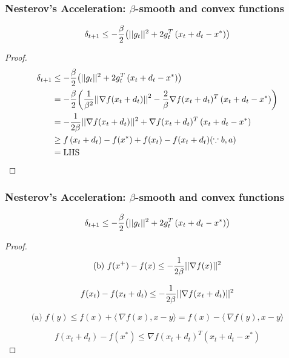 \begin{frame}\frametitle{ Nesterov’s Acceleration: $\beta$-smooth and convex functions}
$$\delta_{t+1} \leq -{\beta \over 2}{\left(||g_t||^2 + 2g_t^T\left(x_t+d_t-x^*\right)\right)}$$
\begin{proof}

\begin{align*}
\delta_{t+1}  &\leq -{\beta \over 2}{\left(||g_t||^2 + 2g_t^T\left(x_t+d_t-x^*\right)\right)} \\
&=  -{\beta \over 2}{\left({1 \over \beta^2}{||\nabla f(x_t+d_t)||}^2 -{2 \over \beta}\nabla f(x_t+d_t)^T\left(x_t+d_t-x^*\right)\right)} \\
&= -{1 \over 2\beta}||\nabla f(x_t+d_t)||^2+\nabla f(x_t+d_t)^T\left(x_t+d_t-x^*\right) \\
&\geq f \left(x_t+d_t\right) -f(x^*)+f(x_t) -f(x_t+d_t) (\because{b,a}) \\
&=\text{LHS}\\
\end{align*}

\end{proof}

\end{frame}

\begin{frame}\frametitle{ Nesterov’s Acceleration: $\beta$-smooth and convex functions}
$$\delta_{t+1} \leq -{\beta \over 2}{\left(||g_t||^2 + 2g_t^T\left(x_t+d_t-x^*\right)\right)}$$
\begin{proof}
$$\text{(b) }f(x^+) - f(x) \leq - {1\over {2\beta}} ||\nabla f(x)||^2 $$

$$f(x_t) -f(x_t+d_t)  \leq -{1 \over 2\beta}||\nabla f(x_t+d_t)||^2 $$

$$\text{(a) }f(y) \leq f(x) + \langle\ \nabla f(x), x-y\rangle = f(x)-\langle\ \nabla f(y), x-y\rangle$$

$$f \left(x_t+d_t\right) -f(x^*) \leq \nabla f(x_t+d_t)^T\left(x_t+d_t-x^*\right)$$


\end{proof}

\end{frame}





